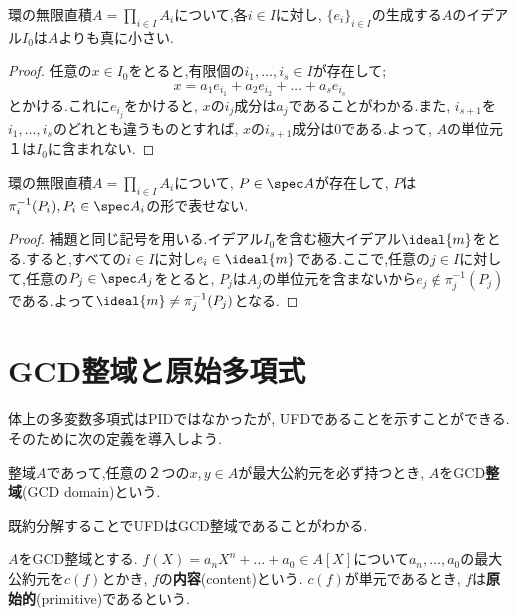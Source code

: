 \begin{lem}
	環の無限直積$A=\prod_{i\in I}A_i$について,各$i\in I$に対し, $\{e_i\}_{i\in I}$の生成する$A$のイデアル$I_0$は$A$よりも真に小さい.
\end{lem}

\begin{proof}
	任意の$x\in I_0$をとると,有限個の$i_1,\dots,i_s\in I$が存在して;
	\[x=a_1e_{i_1}+a_2e_{i_2}+\dots+a_se_{i_s}\]
	とかける.これに$e_{i_j}$をかけると, $x$の$i_j$成分は$a_j$であることがわかる.また, $i_{s+1}$を$i_1,\dots,i_s$のどれとも違うものとすれば, $x$の$i_{s+1}$成分は0である.よって, $A$の単位元$１$は$I_0$に含まれない.
\end{proof}

\begin{prop}
	環の無限直積$A=\prod_{i\in I}A_i$について, $P\in\spec A$が存在して, $P$は$\pi^{-1}_i(P_i), P_i\in\spec A_i$の形で表せない.
\end{prop}

\begin{proof}
	補題と同じ記号を用いる.イデアル$I_0$を含む極大イデアル$\ideal{m}$をとる.すると,すべての$i\in I$に対し$e_i\in\ideal{m}$である.ここで,任意の$j\in I$に対して,任意の$P_j\in\spec A_j$をとると, $P_j$は$A_j$の単位元を含まないから$e_j\not\in\pi^{-1}_j(P_j)$である.よって$\ideal{m}\neq\pi_j^{-1}(P_j)$となる.
\end{proof}

\section{GCD整域と原始多項式}
体上の多変数多項式はPIDではなかったが, UFDであることを示すことができる.そのために次の定義を導入しよう.

\begin{defi}[GCD整域]\label{defi:GCDdomain}
	整域$A$であって,任意の２つの$x,y\in A$が最大公約元を必ず持つとき, $A$をGCD\textbf{整域}(GCD domain)という.
\end{defi}

既約分解することでUFDはGCD整域であることがわかる.

\begin{defi}[内容,原始多項式]
	$A$をGCD整域とする. $f(X)=a_nX^n+\dots+a_0\in A[X]$について$a_n,\dots,a_0$の最大公約元を$c(f)$とかき, $f$の\textbf{内容}(content)という. $c(f)$が単元であるとき, $f$は\textbf{原始的}(primitive)であるという.
\end{defi}

